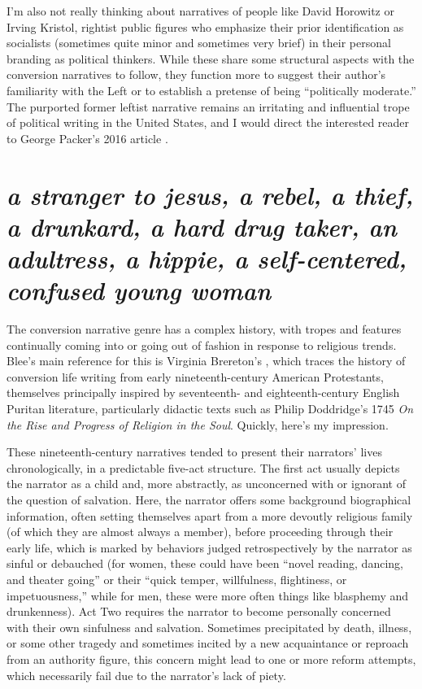 \documentclass[11pt]{article}
\begin{document}
I'm also not really thinking about narratives of people like David Horowitz or Irving Kristol, rightist public figures who emphasize their prior identification as socialists (sometimes quite minor and sometimes very brief) in their personal branding as political thinkers. While these share some structural aspects with the conversion narratives to follow, they function more to suggest their author's familiarity with the Left or to establish a pretense of being ``politically moderate.'' The purported former leftist narrative remains an irritating and influential trope of political writing in the United States, and I would direct the interested reader to George Packer's 2016 article .\autocite{NewYorker16} 

\section*{{\itshape a stranger to jesus, a rebel, a thief, a drunkard, a hard drug taker, an adultress, a hippie, a self-centered, confused young woman}\autocite[43]{Br91}}

The conversion narrative genre has a complex history, with tropes and features continually coming into or going out of fashion in response to religious trends. Blee's main reference for this is Virginia Brereton's , which traces the history of conversion life writing from early nineteenth-century American Protestants, themselves principally inspired by seventeenth- and eighteenth-century English Puritan literature, particularly didactic texts such as Philip Doddridge's 1745 \textit{On the Rise and Progress of Religion in the Soul}.\autocite[10]{Br91} Quickly, here's my impression.

These nineteenth-century narratives tended to present their narrators' lives chronologically, in a predictable five-act structure.\autocite[6]{Br91} The first act usually depicts the narrator as a child and, more abstractly, as unconcerned with or ignorant of the question of salvation. Here, the narrator offers some background biographical information, often setting themselves apart from a more devoutly religious family (of which they are almost always a member), before proceeding through their early life, which is marked by behaviors judged retrospectively by the narrator as sinful or debauched (for women, these could have been ``novel reading, dancing, and theater going'' or their ``quick temper, willfulness, flightiness, or impetuousness,'' while for men, these were more often things like blasphemy and drunkenness). Act Two requires the narrator to become personally concerned with their own sinfulness and salvation. Sometimes precipitated by death, illness, or some other tragedy and sometimes incited by a new acquaintance or reproach from an authority figure, this concern might lead to one or more reform attempts, which necessarily fail due to the narrator's lack of piety. 
\end{document}
